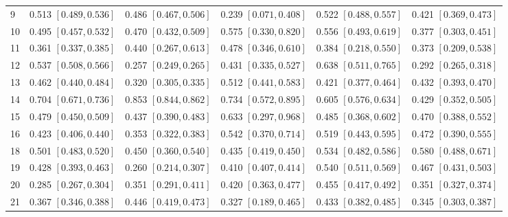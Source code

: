 \begin{landscape}
\begin{longtable}{lccccc}
9 & 0.513 {\scriptsize$[0.489,0.536]$} & 0.486 {\scriptsize$[0.467,0.506]$} & 0.239 {\scriptsize$[0.071,0.408]$} & 0.522 {\scriptsize$[0.488,0.557]$} & 0.421 {\scriptsize$[0.369,0.473]$} \\
10 & 0.495 {\scriptsize$[0.457,0.532]$} & 0.470 {\scriptsize$[0.432,0.509]$} & 0.575 {\scriptsize$[0.330,0.820]$} & 0.556 {\scriptsize$[0.493,0.619]$} & 0.377 {\scriptsize$[0.303,0.451]$} \\
11 & 0.361 {\scriptsize$[0.337,0.385]$} & 0.440 {\scriptsize$[0.267,0.613]$} & 0.478 {\scriptsize$[0.346,0.610]$} & 0.384 {\scriptsize$[0.218,0.550]$} & 0.373 {\scriptsize$[0.209,0.538]$} \\
12 & 0.537 {\scriptsize$[0.508,0.566]$} & 0.257 {\scriptsize$[0.249,0.265]$} & 0.431 {\scriptsize$[0.335,0.527]$} & 0.638 {\scriptsize$[0.511,0.765]$} & 0.292 {\scriptsize$[0.265,0.318]$} \\
13 & 0.462 {\scriptsize$[0.440,0.484]$} & 0.320 {\scriptsize$[0.305,0.335]$} & 0.512 {\scriptsize$[0.441,0.583]$} & 0.421 {\scriptsize$[0.377,0.464]$} & 0.432 {\scriptsize$[0.393,0.470]$} \\
14 & 0.704 {\scriptsize$[0.671,0.736]$} & 0.853 {\scriptsize$[0.844,0.862]$} & 0.734 {\scriptsize$[0.572,0.895]$} & 0.605 {\scriptsize$[0.576,0.634]$} & 0.429 {\scriptsize$[0.352,0.505]$} \\
15 & 0.479 {\scriptsize$[0.450,0.509]$} & 0.437 {\scriptsize$[0.390,0.483]$} & 0.633 {\scriptsize$[0.297,0.968]$} & 0.485 {\scriptsize$[0.368,0.602]$} & 0.470 {\scriptsize$[0.388,0.552]$} \\
16 & 0.423 {\scriptsize$[0.406,0.440]$} & 0.353 {\scriptsize$[0.322,0.383]$} & 0.542 {\scriptsize$[0.370,0.714]$} & 0.519 {\scriptsize$[0.443,0.595]$} & 0.472 {\scriptsize$[0.390,0.555]$} \\
18 & 0.501 {\scriptsize$[0.483,0.520]$} & 0.450 {\scriptsize$[0.360,0.540]$} & 0.435 {\scriptsize$[0.419,0.450]$} & 0.534 {\scriptsize$[0.482,0.586]$} & 0.580 {\scriptsize$[0.488,0.671]$} \\
19 & 0.428 {\scriptsize$[0.393,0.463]$} & 0.260 {\scriptsize$[0.214,0.307]$} & 0.410 {\scriptsize$[0.407,0.414]$} & 0.540 {\scriptsize$[0.511,0.569]$} & 0.467 {\scriptsize$[0.431,0.503]$} \\
20 & 0.285 {\scriptsize$[0.267,0.304]$} & 0.351 {\scriptsize$[0.291,0.411]$} & 0.420 {\scriptsize$[0.363,0.477]$} & 0.455 {\scriptsize$[0.417,0.492]$} & 0.351 {\scriptsize$[0.327,0.374]$} \\
21 & 0.367 {\scriptsize$[0.346,0.388]$} & 0.446 {\scriptsize$[0.419,0.473]$} & 0.327 {\scriptsize$[0.189,0.465]$} & 0.433 {\scriptsize$[0.382,0.485]$} & 0.345 {\scriptsize$[0.303,0.387]$} \\

\end{longtable}
\end{landscape}
